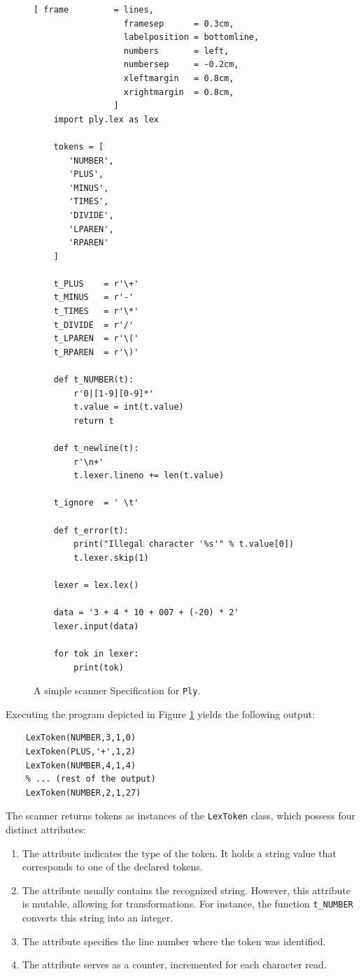 \begin{figure}[!ht]
\centering
\begin{Verbatim}[ frame         = lines, 
                  framesep      = 0.3cm, 
                  labelposition = bottomline,
                  numbers       = left,
                  numbersep     = -0.2cm,
                  xleftmargin   = 0.8cm,
                  xrightmargin  = 0.8cm,
                ]
    import ply.lex as lex
    
    tokens = [
       'NUMBER',
       'PLUS',
       'MINUS',
       'TIMES',
       'DIVIDE',
       'LPAREN',
       'RPAREN'
    ]
    
    t_PLUS    = r'\+'
    t_MINUS   = r'-'
    t_TIMES   = r'\*'
    t_DIVIDE  = r'/'
    t_LPAREN  = r'\('
    t_RPAREN  = r'\)'
    
    def t_NUMBER(t):
        r'0|[1-9][0-9]*'
        t.value = int(t.value)
        return t
    
    def t_newline(t):
        r'\n+'
        t.lexer.lineno += len(t.value)
    
    t_ignore  = ' \t'
    
    def t_error(t):
        print("Illegal character '%s'" % t.value[0])
        t.lexer.skip(1)
    
    lexer = lex.lex()
    
    data = '3 + 4 * 10 + 007 + (-20) * 2'
    lexer.input(data)
    
    for tok in lexer:
        print(tok)
\end{Verbatim}
\vspace*{-0.3cm}
\caption{A simple scanner Specification for \texttt{Ply}.}
\label{fig:Ply-Example.ipynb}
\end{figure}

\noindent
Executing the program depicted in Figure \ref{fig:Ply-Example.ipynb} yields the following output:

\begin{verbatim}
    LexToken(NUMBER,3,1,0)
    LexToken(PLUS,'+',1,2)
    LexToken(NUMBER,4,1,4)
    % ... (rest of the output)
    LexToken(NUMBER,2,1,27)
\end{verbatim}
The scanner returns tokens as instances of the \texttt{LexToken} class, which possess four distinct attributes:
\begin{enumerate}
\item The  attribute indicates the type of the token. It holds a string value that
      corresponds to one of the declared tokens. 
\item The  attribute usually contains the recognized string. However, this attribute is
      mutable, allowing for transformations. For instance, the function \texttt{t\_NUMBER} converts this string
      into an integer. 
\item The  attribute specifies the line number where the token was identified.
\item The  attribute serves as a counter, incremented for each character read.
\end{enumerate}

